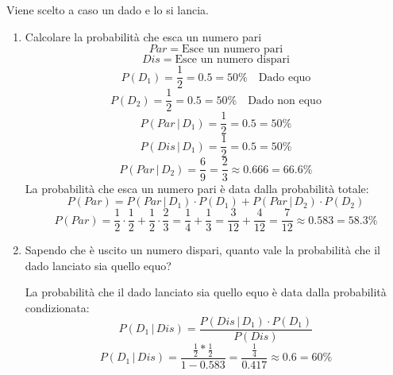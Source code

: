 \documentclass[a4paper]{article}
\theoremstyle{break}
\theoremstyle{break}
\theoremstyle{break}
\theoremstyle{break}
\begin{document}
\noindent Viene scelto a caso un dado e lo si lancia.
\begin{enumerate}
	\item Calcolare la probabilità che esca un numero pari
	      \[
		      Par = \text{Esce un numero pari}
	      \]
        \[
          Dis = \text{Esce un numero dispari}
        \] 
	      \[
		      P(D_1) = \frac{1}{2} = 0.5 = 50\% \quad \text{Dado equo}
	      \]
	      \[
		      P(D_2) = \frac{1}{2} = 0.5 = 50\% \quad \text{Dado non equo}
	      \]
	      \[
		      P(Par\,|\,D_1) = \frac{1}{2} = 0.5 = 50\%
	      \]
        \[
          P(Dis\,|\,D_1) = \frac{1}{2} = 0.5 = 50\%
        \] 
	      \[
		      P(Par\,|\,D_2) = \frac{6}{9} = \frac{2}{3} \approx 0.666 = 66.6\%
	      \]
        La probabilità che esca un numero pari è data dalla probabilità totale:
        \[
          P(Par) = P(Par\,|\,D_1) \cdot P(D_1) + P(Par\,|\,D_2) \cdot P(D_2)
        \] 
        \[
          P(Par) = \frac{1}{2} \cdot \frac{1}{2} + \frac{1}{2} \cdot \frac{2}{3} = \frac{1}{4} + \frac{1}{3} = \frac{3}{12} + \frac{4}{12} = \frac{7}{12} \approx 0.583 = 58.3\% 
        \] 
	\item Sapendo che è uscito un numero dispari, quanto vale la probabilità che il dado
	      lanciato sia quello equo?

        \vspace{1em}
        \noindent La probabilità che il dado lanciato sia quello equo è data dalla probabilità
        condizionata:
        \[
        P(D_1\,|\,Dis) = \frac{P(Dis\,|\,D_1)\cdot P(D_1)}{P(Dis)}
        \] 
        \[
        P(D_1\,|\,Dis) = \frac{\frac{1}{2}*\frac{1}{2}}{1 - 0.583} = \frac{\frac{1}{4}}{0.417} \approx 0.6 = 60\%
        \] 
\end{enumerate}
\end{document}
